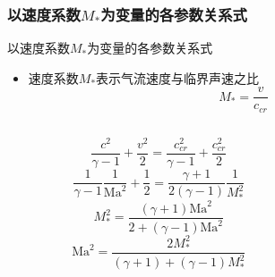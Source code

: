 \subsubsection{以速度系数$M_{*}$为变量的各参数关系式}
\begin{frame}{以速度系数$M_{*}$为变量的各参数关系式}
  \begin{itemize}
    \item 速度系数$M_{*}$表示气流速度与临界声速之比
      \begin{equation*}
        M_{*}
        =
        \frac{v}{c_{cr}}
      \end{equation*}
  \end{itemize}
  \vspace*{-1.5em}
  \begin{columns}[c]
    \begin{column}{0.45\textwidth}
  \begin{equation*}
    \frac{c^{2}}{\gamma-1}
    +
    \frac{v^{2}}{2}
    =
    \frac{c_{cr}^{2}}{\gamma-1}
    +
    \frac{c_{cr}^{2}}{2}
  \end{equation*}
  \begin{equation*}
    \frac{1}{\gamma-1}\frac{1}{\mathrm{Ma}^{2}}
    +
    \frac{1}{2}
    =
    \frac{\gamma+1}{2(\gamma-1)}\frac{1}{M_{*}^{2}}
  \end{equation*}
  \begin{equation*}
    M_{*}^{2}
    =
    \frac{(\gamma+1)\mathrm{Ma}^{2}}{2+(\gamma-1)\mathrm{Ma}^{2}}
  \end{equation*}
  \begin{equation*}
    \mathrm{Ma}^{2}
    =
  \frac{2M_{*}^{2}}{(\gamma+1)+(\gamma-1)M_{*}^{2}}
  \end{equation*}
    \end{column}
  
    \begin{column}{0.55\textwidth}
      \begin{center}
      \end{center}
    \end{column}
  \end{columns}
\end{frame}

